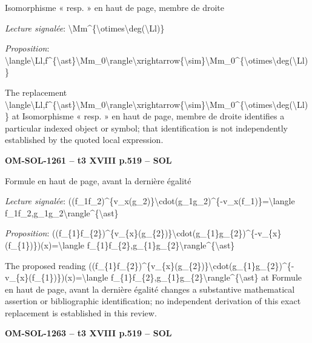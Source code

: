 Isomorphisme « resp. » en haut de page, membre de droite\par
\emph{Lecture signalée}: \textbackslash{}Mm\textasciicircum{}\{\textbackslash{}otimes\textbackslash{}deg(\textbackslash{}Ll)\}\par
\emph{Proposition}: \textbackslash{}langle\textbackslash{}Ll,f\textasciicircum{}\{\textbackslash{}ast\}\textbackslash{}Mm\_0\textbackslash{}rangle\textbackslash{}xrightarrow\{\textbackslash{}sim\}\textbackslash{}Mm\_0\textasciicircum{}\{\textbackslash{}otimes\textbackslash{}deg(\textbackslash{}Ll)\}\par
The replacement \textbackslash{}langle\textbackslash{}Ll,f\textasciicircum{}\{\textbackslash{}ast\}\textbackslash{}Mm\_0\textbackslash{}rangle\textbackslash{}xrightarrow\{\textbackslash{}sim\}\textbackslash{}Mm\_0\textasciicircum{}\{\textbackslash{}otimes\textbackslash{}deg(\textbackslash{}Ll)\} at Isomorphisme « resp. » en haut de page, membre de droite identifies a particular indexed object or symbol; that identification is not independently established by the quoted local expression.\par
\par\noindent\textbf{OM-SOL-1261 -- t3 XVIII p.519 -- SOL}\par
Formule en haut de page, avant la dernière égalité\par
\emph{Lecture signalée}: ((f\_1f\_2)\textasciicircum{}\{v\_x(g\_2)\}\textbackslash{}cdot(g\_1g\_2)\textasciicircum{}\{-v\_x(f\_1)\}=\allowbreak \textbackslash{}langle f\_1f\_2,g\_1g\_2\textbackslash{}rangle\textasciicircum{}\{\textbackslash{}ast\}\par
\emph{Proposition}: ((f\_\{1\}f\_\{2\})\textasciicircum{}\{v\_\{x\}(g\_\{2\})\}\textbackslash{}cdot(g\_\{1\}g\_\{2\})\textasciicircum{}\{-v\_\{x\}(f\_\{1\})\})(x)=\allowbreak \textbackslash{}langle f\_\{1\}f\_\{2\},g\_\{1\}g\_\{2\}\textbackslash{}rangle\textasciicircum{}\{\textbackslash{}ast\}\par
The proposed reading ((f\_\{1\}f\_\{2\})\textasciicircum{}\{v\_\{x\}(g\_\{2\})\}\textbackslash{}cdot(g\_\{1\}g\_\{2\})\textasciicircum{}\{-v\_\{x\}(f\_\{1\})\})(x)=\allowbreak \textbackslash{}langle f\_\{1\}f\_\{2\},g\_\{1\}g\_\{2\}\textbackslash{}rangle\textasciicircum{}\{\textbackslash{}ast\} at Formule en haut de page, avant la dernière égalité changes a substantive mathematical assertion or bibliographic identification; no independent derivation of this exact replacement is established in this review.\par
\par\noindent\textbf{OM-SOL-1263 -- t3 XVIII p.519 -- SOL}\par
